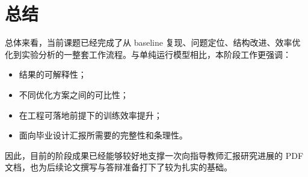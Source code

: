 \documentclass[12pt,a4paper]{ctexart}
\begin{document}
\section{总结}
总体来看，当前课题已经完成了从 baseline 复现、问题定位、结构改进、效率优化到实验分析的一整套工作流程。与单纯运行模型相比，本阶段工作更强调：
\begin{itemize}
  \item 结果的可解释性；
  \item 不同优化方案之间的可比性；
  \item 在工程可落地前提下的训练效率提升；
  \item 面向毕业设计汇报所需要的完整性和条理性。
\end{itemize}

因此，目前的阶段成果已经能够较好地支撑一次向指导教师汇报研究进展的 PDF 文档，也为后续论文撰写与答辩准备打下了较为扎实的基础。
\end{document}
